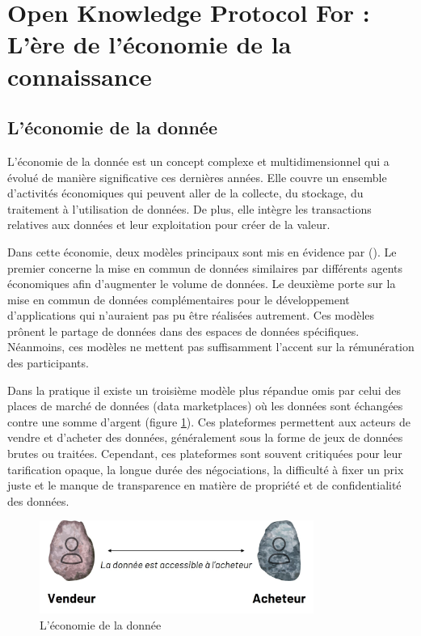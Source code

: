 \section{Open Knowledge Protocol For : L'ère de l'économie de la connaissance }\label{sec:know_era}


\subsection{L'économie de la donnée} \label{subsec:economie_de_la_donnee}


L'économie de la donnée est un concept complexe et multidimensionnel qui a évolué de manière significative ces dernières années. Elle couvre un ensemble d'activités économiques qui peuvent aller de la collecte, du stockage, du traitement à l'utilisation de données. De plus, elle intègre les transactions relatives aux données et leur exploitation pour créer de la valeur.

Dans cette économie, deux modèles principaux sont mis en évidence par \citeauthor{otto_designing_2022} (\citeyear{otto_designing_2022}). Le premier concerne la mise en commun de données similaires par différents agents économiques afin d'augmenter le volume de données. Le deuxième porte sur la mise en commun de données complémentaires pour le développement d'applications qui n'auraient pas pu être réalisées autrement. Ces modèles prônent le partage de données dans des espaces de données spécifiques. Néanmoins, ces modèles ne mettent pas suffisamment l'accent sur la rémunération des participants.

Dans la pratique il existe un troisième modèle plus répandue omis par \citeauthor{otto_designing_2022}  celui des places de marché de données (data marketplaces) où les données sont échangées contre une somme d'argent (figure \ref{fig:economie_donnée}). Ces plateformes permettent aux acteurs de vendre et d'acheter des données, généralement sous la forme de jeux de données brutes ou traitées. Cependant, ces plateformes sont souvent critiquées pour leur tarification opaque, la longue durée des négociations, la difficulté à fixer un prix juste et le manque de transparence en matière de propriété et de confidentialité des données.

\begin{figure}[h]
    \centering
    \includegraphics[width=0.8\textwidth]{ILLUSTRATIONS/data_economie.jpg}
    \caption{L'économie de la donnée}
    \label{fig:economie_donnée}
\end{figure}

